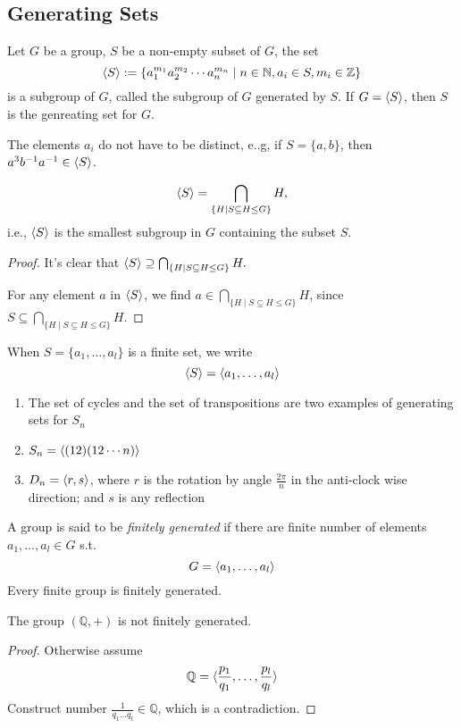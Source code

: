 \subsection{Generating Sets}
\begin{definition}
Let $G$ be a group, $S$ be a non-empty subset of $G$, the set
\[
\langle S\rangle:=\{a_1^{m_1}a_2^{m_2}\cdots a_n^{m_n}\mid n\in\mathbb{N},a_i\in S,m_i\in\mathbb{Z}\}
\]
is a subgroup of $G$, called the subgroup of $G$ generated by $S$. If $G=\langle S\rangle$, then $S$ is the genreating set for $G$.
\end{definition}
\begin{remark}
The elements $a_i$ do not have to be distinct, e..g, if $S=\{a,b\}$, then $a^3b^{-1}a^{-1}\in\langle S\rangle$.
\end{remark}
\begin{proposition}
\[
\langle S\rangle=\bigcap_{\{H\mid S\subseteq H\le G\}}H,
\]
i.e., $\langle S\rangle$ is the smallest subgroup in $G$ containing the subset $S$.
\end{proposition}
\begin{proof}
It's clear that $\langle S\rangle\supseteq \bigcap_{\{H\mid S\subseteq H\le G\}}H.$

For any element $a$ in $\langle S\rangle$, we find $a\in \bigcap_{\{H\mid S\subseteq H\le G\}}H$, since $S\subseteq\bigcap_{\{H\mid S\subseteq H\le G\}}H.$

\end{proof}
When $S=\{a_1,\dots,a_l\}$ is a finite set, we write
\[
\langle S\rangle = \langle a_1,\dots,a_l\rangle
\]
\begin{example}
\begin{enumerate}
\item
The set of cycles and the set of transpositions are two examples of generating sets for $S_n$
\item
$S_n=\langle (12)(12\cdots n)\rangle$
\item
$D_n = \langle r,s\rangle$, where $r$ is the rotation by angle $\frac{2\pi}{n}$ in the anti-clock wise direction; and $s$ is any reflection
\end{enumerate}
\end{example}
A group is said to be \emph{finitely generated} if there are finite number of elements $a_1,\dots,a_l\in G$ s.t.
\[
G=\langle a_1,\dots,a_l\rangle
\]
Every finite group is finitely generated.
\begin{proposition}
The group $(\mathbb{Q},+)$ is not finitely generated.
\end{proposition}
\begin{proof}
Otherwise assume
\[
\mathbb{Q}=\langle \frac{p_1}{q_1},\dots,\frac{p_l}{q_l}\rangle
\]
Construct number $\frac{1}{q_1\dots q_l}\in\mathbb{Q}$, which is a contradiction.
\end{proof}
